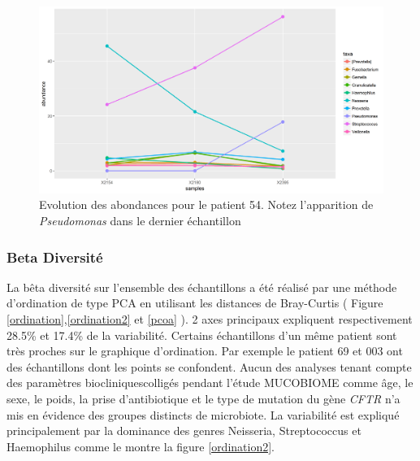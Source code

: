 \documentclass[12pt,a4paper]{article}
\begin{document}
\begin{figure}
\begin{center}
\includegraphics[scale=0.60]{img/curve_054.png}\hfill
\end{center}
\caption{Evolution des abondances pour le patient 54. Notez l'apparition de \textit{Pseudomonas} dans le dernier échantillon}
\label{evolution54}
\end{figure}

\subsubsection{Beta Diversité}
La bêta diversité sur l’ensemble des échantillons a été réalisé par une méthode d’ordination de type PCA en utilisant les distances de Bray-Curtis ( Figure \ref{ordination},\ref{ordination2} et \ref{pcoa} ).
2 axes principaux expliquent respectivement 28.5\% et 17.4\% de la variabilité.
Certains échantillons d’un même patient sont très proches sur le graphique d’ordination. Par exemple le patient 69 et 003 ont des échantillons dont les points se confondent.
Aucun des analyses tenant compte des paramètres biocliniquescolligés pendant l'étude MUCOBIOME comme âge, le sexe, le poids, la prise d'antibiotique et le type de mutation du gène \textit{CFTR} n’a mis en évidence des groupes distincts de microbiote. La variabilité est expliqué principalement par la dominance des genres Neisseria, Streptococcus et Haemophilus comme le montre la figure \ref{ordination2}.
\end{document}
